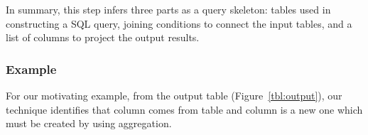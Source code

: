 In summary, this step infers three parts as a query skeleton: tables used in constructing a SQL query, joining conditions
to connect the input tables, and a list of columns to project the output results.





\subsubsection{Example}

For our motivating example, from the output table (Figure~\ref{tbl:output}), our technique identifies that
column {} comes from table  and
column {} is a new one which must be created by using aggregation.


